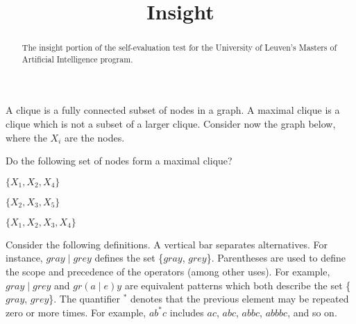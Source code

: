\documentclass{ximera}
\title{Insight}
\begin{document}
\begin{abstract}
The insight portion of the self-evaluation test for the University of
Leuven's Masters of Artificial Intelligence program.
\end{abstract}
\maketitle


\begin{question}
A clique is  a fully connected subset of nodes in a graph. 
A maximal clique is a clique which is not a subset of a larger clique.
Consider now the graph below, where the $X_i$ are the nodes.  
\begin{image}
\end{image}

Do the following set of nodes form a  maximal clique? 


$\{X_1,X_2,X_4\}$
\begin{multipleChoice}
\end{multipleChoice}

$\{X_2,X_3,X_5\}$
\begin{multipleChoice}
\end{multipleChoice}

$\{X_1,X_2,X_3,X_4\}$
\begin{multipleChoice}
\end{multipleChoice}


\end{question}

Consider the following definitions.  
A vertical bar separates alternatives. For instance, $gray  \mid grey$ defines the set \{$gray$, $grey$\}.
Parentheses are used to define the scope and precedence of the operators (among other uses). For example, $gray \mid grey$ and $gr(a\mid e)y$ are equivalent patterns which both describe the set 
 \{$gray$, $grey$\}.
The quantifier $^*$ denotes that the previous element may be repeated zero or more times. 
 For example, $ab^*c$ includes $ac$, $abc$, $abbc$, $abbbc$, and so on.
\end{document}
